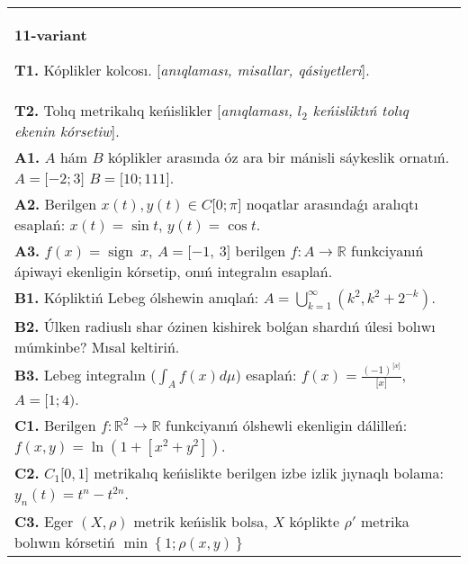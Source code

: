 \documentclass{article}
\DeclareMathOperator{\sign}{sign}
\begin{document}
\begin{tabular}{m{17cm}}
\textbf{11-variant}
\newline

\textbf{T1.} Kóplikler kolcosı. [\textit{anıqlaması, misallar, qásiyetleri}]. \\
\textbf{T2.} Tolıq metrikalıq keńislikler [\textit{anıqlaması, \(l_{2}\) keńisliktıń tolıq ekenin kórsetiw}]. \\
\textbf{A1.} \(A\) hám \(B\) kóplikler arasında óz ara bir mánisli sáykeslik ornatıń. \(A = \lbrack - 2;3\rbrack\) \(B = \lbrack 10;111\rbrack\). \\
\textbf{A2.} Berilgen \(x(t),y(t) \in C\lbrack 0;\pi\rbrack\) noqatlar arasındaǵı aralıqtı esaplań: \(x(t) = \sin t\), \(y(t) = \cos t\). \\
\textbf{A3.} \(f(x) = \sign \ x\), \(A = \lbrack - 1,\ 3\rbrack\) berilgen \(f:A\rightarrow\mathbb{R}\) funkciyanıń ápiwayi ekenligin kórsetip, onıń integralın esaplań. \\
\textbf{B1.} Kópliktiń Lebeg ólshewin anıqlań: \(A = \bigcup_{k = 1}^{\infty}\left( k^{2},k^{2} + 2^{- k} \right)\). \\
\textbf{B2.} Úlken radiuslı shar ózinen kishirek bolǵan shardıń úlesi bolıwı múmkinbe? Mısal keltiriń. \\
\textbf{B3.} Lebeg integralın (\(\int_{A}^{}{f(x)d\mu}\)) esaplań: \(f(x) = \frac{( - 1)^{\lbrack x\rbrack}}{\lbrack x\rbrack}\), \(A = \lbrack 1;4)\). \\
\textbf{C1.} Berilgen \(f:\mathbb{R}^{2}\mathbb{\rightarrow R}\) funkciyanıń ólshewli ekenligin dálilleń: \(f(x,y) = \ln\left( 1 + \left\lbrack x^{2} + y^{2} \right\rbrack \right)\). \\
\textbf{C2.} \(C_{1}\lbrack 0,1\rbrack\) metrikalıq keńislikte berilgen izbe izlik jıynaqlı bolama: \(y_{n}(t) = t^{n} - t^{2n}\). \\
\textbf{C3.} Eger \((X,\rho)\) metrik keńislik bolsa, \(X\) kóplikte \(\rho'\) metrika bolıwın kórsetiń \(\min\left\{ 1;\rho(x,y) \right\}\) \\

\end{tabular}
\vspace{1cm}
\end{document}
